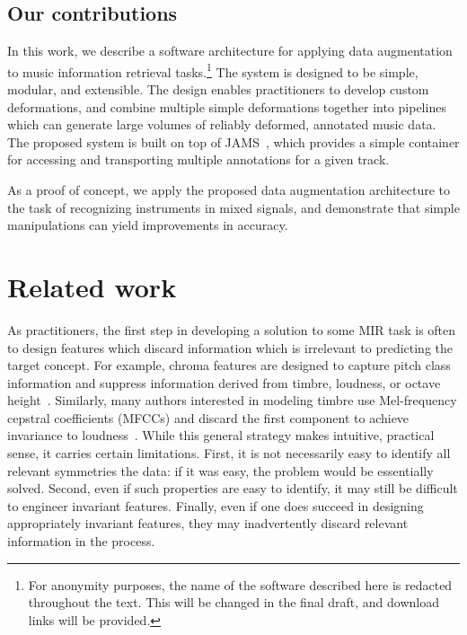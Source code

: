 \documentclass{article}
\begin{document}
\subsection{Our contributions}
In this work, we describe a software architecture for applying data augmentation to music
information retrieval tasks.\footnote{For anonymity purposes, the name of the software
    described here is redacted throughout the text.  This will be changed in the final
draft, and download links will be provided.}
The system is designed to be simple, modular, and
extensible. The design enables practitioners to develop custom deformations, and combine 
multiple simple deformations together into pipelines which can generate large volumes of 
reliably deformed, annotated music data.  The proposed system is built on top of
JAMS~\cite{humphreyjams}, which provides a simple container for accessing and
transporting multiple annotations for a given track.  

As a proof of concept, we apply the proposed data augmentation architecture to the
task of recognizing instruments in mixed signals, and demonstrate that simple
manipulations can yield improvements in accuracy.

\section{Related work}

As practitioners, the first step in developing a solution to some MIR task is often to 
design features which discard information which is irrelevant to predicting the target
concept.  For example, chroma features are designed to capture pitch class information
and suppress information derived from timbre, loudness, or octave 
height~\cite{muller2011chroma}.  Similarly, many authors interested in modeling timbre
use Mel-frequency cepstral coefficients (MFCCs) and discard the first component to
achieve invariance to loudness~\cite{pampalk2004matlab}.
While this general strategy makes intuitive, practical sense, it carries certain
limitations.  First, it is not necessarily easy to identify all relevant symmetries the
data: if it was easy, the problem would be essentially solved.  Second, even if such
properties are easy to identify, it may still be difficult to engineer invariant
features.  Finally, even if one does succeed in designing appropriately invariant
features, they may inadvertently discard relevant information in the process.
\end{document}
